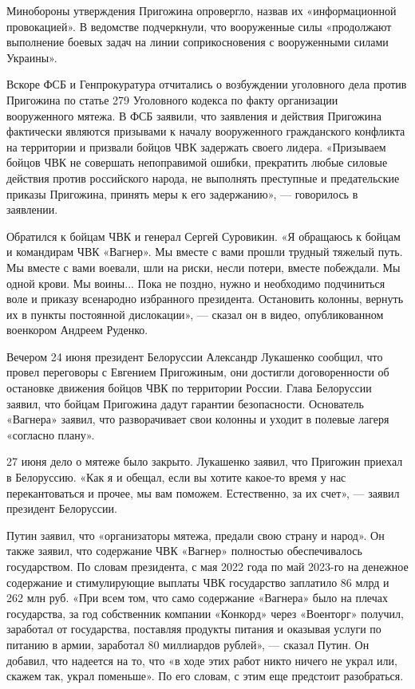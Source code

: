 Минобороны утверждения Пригожина опровергло, назвав их «информационной провокацией». В ведомстве подчеркнули, что вооруженные силы «продолжают выполнение боевых задач на линии соприкосновения с вооруженными силами Украины».

Вскоре ФСБ и Генпрокуратура отчитались о возбуждении уголовного дела против Пригожина по статье 279 Уголовного кодекса по факту организации вооруженного мятежа. В ФСБ заявили, что заявления и действия Пригожина фактически являются призывами к началу вооруженного гражданского конфликта на территории и призвали бойцов ЧВК задержать своего лидера. «Призываем бойцов ЧВК не совершать непоправимой ошибки, прекратить любые силовые действия против российского народа, не выполнять преступные и предательские приказы Пригожина, принять меры к его задержанию», — говорилось в заявлении.

Обратился к бойцам ЧВК и генерал Сергей Суровикин. «Я обращаюсь к бойцам и командирам ЧВК «Вагнер». Мы вместе с вами прошли трудный тяжелый путь. Мы вместе с вами воевали, шли на риски, несли потери, вместе побеждали. Мы одной крови. Мы воины... Пока не поздно, нужно и необходимо подчиниться воле и приказу всенародно избранного президента. Остановить колонны, вернуть их в пункты постоянной дислокации», — сказал он в видео, опубликованном военкором Андреем Руденко.

Вечером 24 июня президент Белоруссии Александр Лукашенко сообщил, что провел переговоры с Евгением Пригожиным, они достигли договоренности об остановке движения бойцов ЧВК по территории России. Глава Белоруссии заявил, что бойцам Пригожина дадут гарантии безопасности. Основатель «Вагнера» заявил, что разворачивает свои колонны и уходит в полевые лагеря «согласно плану».

27 июня дело о мятеже было закрыто. Лукашенко заявил, что Пригожин приехал в Белоруссию. «Как я и обещал, если вы хотите какое-то время у нас перекантоваться и прочее, мы вам поможем. Естественно, за их счет», — заявил президент Белоруссии.

Путин заявил, что «организаторы мятежа, предали свою страну и народ». Он также заявил, что содержание ЧВК «Вагнер» полностью обеспечивалось государством. По словам президента, с мая 2022 года по май 2023-го на денежное содержание и стимулирующие выплаты ЧВК государство заплатило 86 млрд и 262 млн руб. «При всем том, что само содержание «Вагнера» было на плечах государства, за год собственник компании «Конкорд» через «Военторг» получил, заработал от государства, поставляя продукты питания и оказывая услуги по питанию в армии, заработал 80 миллиардов рублей», — сказал Путин. Он добавил, что надеется на то, что «в ходе этих работ никто ничего не украл или, скажем так, украл поменьше». По его словам, с этим еще предстоит разобраться.

